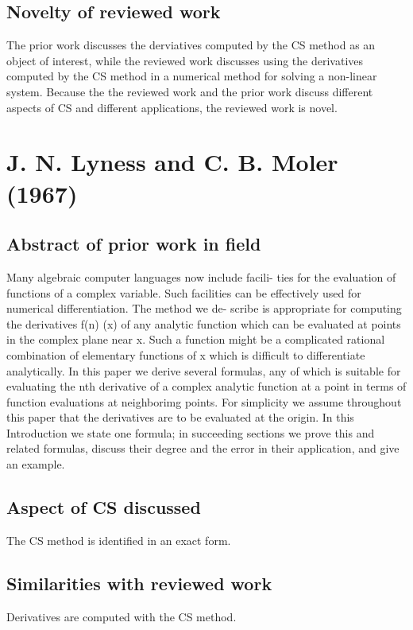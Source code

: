 \documentclass[10pt,letterpaper,draft]{article}
\begin{document}
\subsection{Novelty of reviewed work}
The prior work discusses the derviatives computed by the CS method as an object
of interest, while the reviewed work discusses using the derivatives computed
by the CS method in a numerical method for solving a non-linear system.
Because the the reviewed work and the prior work discuss different aspects of
CS and different applications, the reviewed work is novel.

\section{J. N. Lyness and C. B. Moler (1967)}
\subsection{Abstract of prior work in field}

Many algebraic computer languages now include facili- ties for the evaluation
of functions of a complex variable. Such facilities can be effectively used for
numerical differentiation. The method we de- scribe is appropriate for
computing the derivatives f(n) (x) of any analytic function which can be
evaluated at points in the complex plane near x.  Such a function might be a
complicated rational combination of elementary functions of x which is
difficult to differentiate analytically.  In this paper we derive several
formulas, any of which is suitable for evaluating the nth derivative of a
complex analytic function at a point in terms of function evaluations at
neighborimg points. For simplicity we assume throughout this paper that the
derivatives are to be evaluated at the origin. In this Introduction we state
one formula; in succeeding sections we prove this and related formulas, discuss
their degree and the error in their application, and give an example.

\subsection{Aspect of CS discussed}
The CS method is identified in an exact form.

\subsection{Similarities with reviewed work}
Derivatives are computed with the CS method.
\end{document}
